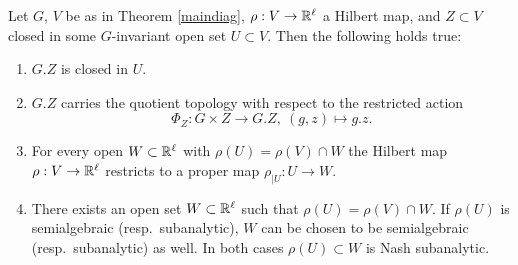\begin{proposition} \label{Prop:TopProp}
Let $G$, $V$ be as in  Theorem  \ref{maindiag},  $\rho : V \rightarrow \mathbb{R}^\ell$ a Hilbert map,
and $Z\subset V$ closed in some $G$-invariant open set $U\subset V$. Then the following holds true: 
\begin{enumerate}
\item \label{It:Closed} $G.Z$ is closed in $U$.
\item \label{It:QuotientTop} 
      $G.Z$ carries the quotient topology with respect to the restricted action 
      \[ \Phi_Z:G\times Z\to G.Z,\: (g,z) \mapsto g.z .\]
\item \label{ite:PropernessRestriction}
      For every open  $W \subset \mathbb{R}^\ell$ with $\rho (U) = \rho (V) \cap W $ the Hilbert map 
      $\rho : V \rightarrow \mathbb{R}^\ell$ restricts to a proper map 
      $\rho_{|U} : U \rightarrow W$.
\item \label{It:ExOpNbhd}
      There exists an open set $W \subset \mathbb{R}^\ell$ such that 
      $\rho (U) = \rho (V) \cap W $. If $\rho (U)$ is semialgebraic (resp.~subanalytic), $W$ can be chosen 
      to be semialgebraic (resp.~subanalytic) as well. 
      In both cases $\rho (U)\subset W$ is Nash subanalytic. 
\end{enumerate}
\end{proposition}

